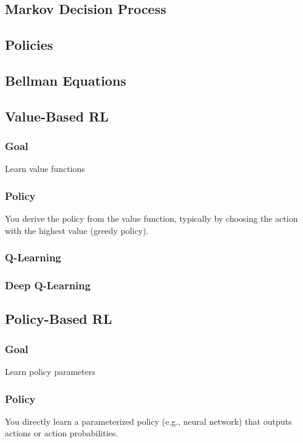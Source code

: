 \documentclass{article}
\begin{document}
\subsection{Markov Decision Process}

\subsection{Policies}

\subsection{Bellman Equations}

\subsection{Value-Based RL}

\subsubsection{Goal} Learn value functions

\subsubsection{Policy} You derive the policy from the value function, typically by choosing the action with the highest value (greedy policy).

\subsubsection{Q-Learning}

\subsubsection{Deep Q-Learning}

\subsection{Policy-Based RL}

\subsubsection{Goal} Learn policy parameters

\subsubsection{Policy} You directly learn a parameterized policy (e.g., neural network) that outputs actions or action probabilities.
\end{document}
